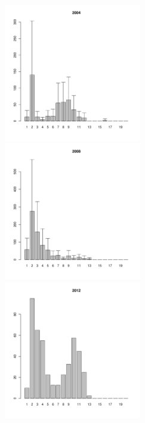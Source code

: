 \documentclass[12pt, a4paper]{article}
\begin{document}
\begin{figure}[h]

\begin{multicols}{3}
\hfill
\includegraphics[width=60mm]{../White_Sea/Luvenga_Goreliy/middle_2004_.pdf}
\hfill
\includegraphics[width=60mm]{../White_Sea/Luvenga_Goreliy/middle_2008_.pdf}
\hfill
\includegraphics[width=60mm]{../White_Sea/Luvenga_Goreliy/middle_2012_.pdf}
\end{multicols}




\end{figure}
\end{document}
